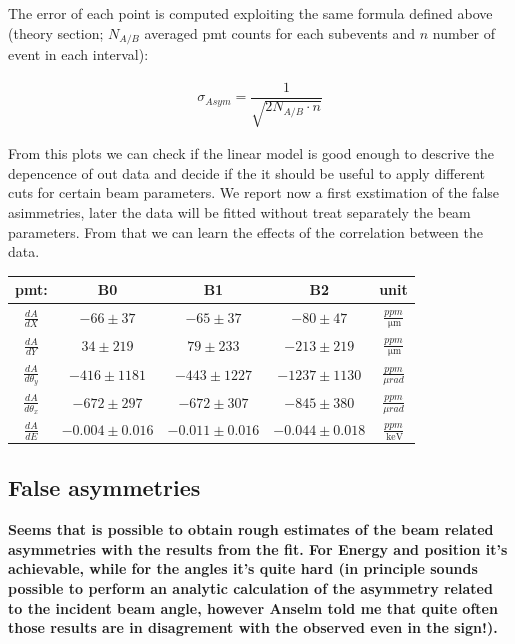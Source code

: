 The error of each point is computed exploiting the same formula defined above (theory section; $N_{A/B}$ averaged pmt counts for each subevents and $n$ number of event in each interval):

\begin{align*}
\sigma_{Asym} = \dfrac{1}{\sqrt{2N_{A/B} \cdot n}}
\end{align*}

From this plots we can check if the linear model is good enough to descrive the depencence of out data and decide if the it should be useful to apply different cuts for certain beam parameters. We report now a first exstimation of the false asimmetries, later the data will be fitted without treat separately the beam parameters. From that we can learn the effects of the correlation between the data.

\begin{center}
\begin{tabular}{||c|c|c|c|c|}
\hline
pmt: & B0 & B1 & B2 & unit \\ 
\hline 
$\frac{dA}{dX} $  & $-66 \pm 37$ & $-65 \pm 37$ & $-80 \pm 47$ & $ \frac{ppm}{\SI{}{\micro \meter}}$\\ 
\hline 
$\frac{dA}{dY} $  & $34 \pm 219$  & $ 79 \pm 233$ & $ -213 \pm 219$ & $\frac{ppm}{\SI{}{\micro \meter} }$ \\ 
\hline 
$\frac{dA}{d\theta_{y}}$ & $-416 \pm 1181$  & $ -443 \pm 1227$ & $-1237 \pm 1130$ & $\frac{ppm}{\mu rad}$\\ 
\hline 
$\frac{dA}{d\theta_{x}}$ & $-672 \pm 297$ & $ -672 \pm 307 $ & $-845 \pm 380$ & $\frac{ppm}{\mu rad}$ \\ 
\hline 
$\frac{dA}{dE}$ & $ -0.004 \pm 0.016 $ & $-0.011 \pm 0.016 $ & $ - 0.044 \pm 0.018 $ & $\frac{ppm}{\SI{}{\kilo \electronvolt}}$\\ 
\hline
\end{tabular} 
\end{center}


\subsection{False asymmetries}
{\bfseries Seems that is possible to obtain rough estimates of the beam related asymmetries with the results from the fit. For Energy and position it's achievable, while for the angles it's quite hard (in principle sounds possible to perform an analytic calculation of the asymmetry related to the incident beam angle, however Anselm told me that quite often those results are in disagrement with the observed even in the sign!).}

